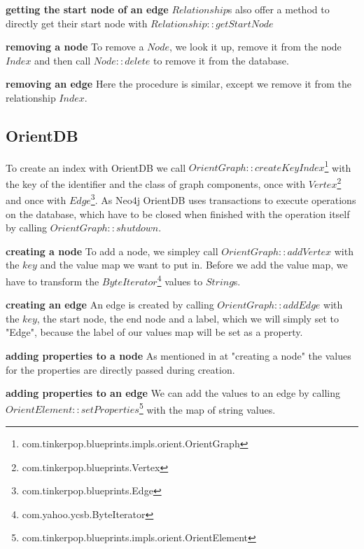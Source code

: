 \textbf{getting the start node of an edge} \newline
$ Relationship $s also offer a method to directly get their start node with $ Relationship::getStartNode $

\textbf{removing a node} \newline
To remove a $ Node $,
we look it up,
remove it from the node $ Index $ and then call $ Node::delete $ to remove it from the database.

\textbf{removing an edge} \newline
Here the procedure is similar,
except we remove it from the relationship $ Index $.

\subsection{OrientDB}
To create an index with OrientDB we call $ OrientGraph::createKeyIndex $\footnote{com.tinkerpop.blueprints.impls.orient.OrientGraph} with the key of the identifier and the class of graph components,
once with $ Vertex $\footnote{com.tinkerpop.blueprints.Vertex} and once with $ Edge $\footnote{com.tinkerpop.blueprints.Edge}.
As Neo4j OrientDB uses transactions to execute operations on the database,
which have to be closed when finished with the operation itself by calling $ OrientGraph::shutdown $.

\textbf{creating a node} \newline
To add a node,
we simpley call $ OrientGraph::addVertex $ with the $ key $ and the value map we want to put in.
Before we add the value map,
we have to transform the $ ByteIterator $\footnote{com.yahoo.ycsb.ByteIterator} values to $ String $s.

\textbf{creating an edge} \newline
An edge is created by calling $ OrientGraph::addEdge $ with the $ key $,
the start node,
the end node and a label,
which we will simply set to "Edge",
because the label of our values map will be set as a property.

\textbf{adding properties to a node} \newline
As mentioned in at "creating a node" the values for the properties are directly passed during creation.

\textbf{adding properties to an edge} \newline
We can add the values to an edge by calling $ OrientElement::setProperties $\footnote{com.tinkerpop.blueprints.impls.orient.OrientElement} with the map of string values.

